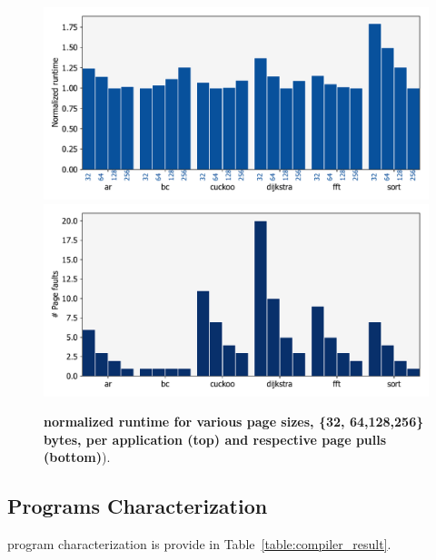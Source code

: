 \begin{figure}
	\centering
	\includegraphics[width=\columnwidth]{figures/page_exec-time}
	\includegraphics[width=\columnwidth]{figures/pagePulls}
	\caption{\textbf{\sys normalized runtime for various page sizes, \{32, 64,128,256\}\,bytes, per application (top) and respective page pulls (bottom)}).}\vspace{-0.5cm}
	\label{fig:page_size}
\end{figure}

\subsection{\sys Programs Characterization}
\label{sec:results_program_characterization}

\sys program characterization is provide in Table~\ref{table:compiler_result}. 

